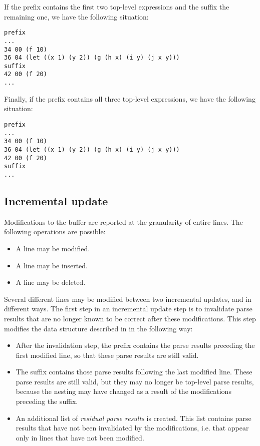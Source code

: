 If the prefix contains the first two top-level expressions and the suffix
the remaining one, we have the following situation:

\begin{verbatim}
prefix
...
34 00 (f 10)
36 04 (let ((x 1) (y 2)) (g (h x) (i y) (j x y)))
suffix
42 00 (f 20)
...
\end{verbatim}

Finally, if the prefix contains all three top-level expressions, we
have the following situation:


\begin{verbatim}
prefix
...
34 00 (f 10)
36 04 (let ((x 1) (y 2)) (g (h x) (i y) (j x y)))
42 00 (f 20)
suffix
...
\end{verbatim}

\subsection{Incremental update}

Modifications to the buffer are reported at the granularity of entire
lines.  The following operations are possible:

\begin{itemize}
\item A line may be modified.
\item A line may be inserted.
\item A line may be deleted.
\end{itemize}

Several different lines may be modified between two incremental
updates, and in different ways.  The first step in an incremental
update step is to invalidate parse results that are no longer known to
be correct after these modifications.  This step modifies the data
structure described in
 in the following
way:

\begin{itemize}
\item After the invalidation step, the prefix contains the parse
  results preceding the first modified line, so that these parse
  results are still valid.
\item The suffix contains those parse results following the last
  modified line.  These parse results are still valid, but they may no
  longer be top-level parse results, because the nesting may have
  changed as a result of the modifications preceding the suffix.
\item An additional list of \emph{residual parse results} is created.
  This list contains parse results that have not been invalidated by
  the modifications, i.e. that appear only in lines that have not been
  modified.
\end{itemize}

